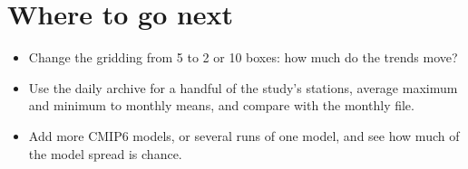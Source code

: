 \section{Where to go next}
\begin{itemize}
\item Change the gridding from 5\textdegree{} to 2\textdegree{} or 10\textdegree{} boxes: how much do the trends move?
\item Use the daily archive for a handful of the study's stations, average maximum and minimum to monthly means, and compare with the monthly file.
\item Add more CMIP6 models, or several runs of one model, and see how much of the model spread is chance.
\end{itemize}
